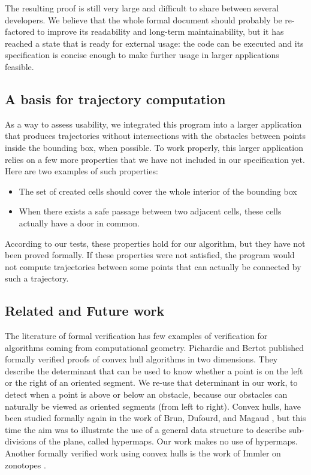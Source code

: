 \documentclass[a4paper, USenglish, cleveref, autoref, thm-restate, final]{lipics-v2021}
\begin{document}
The resulting proof is still very large and difficult to share between several
developers.  We believe that the whole formal document should probably be
re-factored to improve its readability and long-term maintainability, but it
has reached a state that is ready for external usage: the code can be executed
and its specification is concise enough to make further usage in larger
applications feasible.

\subsection{A basis for trajectory computation}
As a way to assess usability, we integrated this program into a larger
application that produces trajectories without intersections with
the obstacles between points inside the bounding
box, when possible.  To work properly, this larger application relies
on a few more properties that we have not included in our specification yet.
Here are two examples of such properties:
\begin{itemize}
\item The set of created cells should cover the whole interior of the
  bounding box
\item When there exists a safe passage between two adjacent cells, these
  cells actually have a door in common.
\end{itemize}
According to our tests, these properties hold for our algorithm, but
they have not been proved formally.  If these properties were not satisfied,
the program would not compute trajectories between some points that can
actually be connected by such a trajectory.

\subsection{Related and Future work}
The literature of formal verification has few examples of verification for
algorithms coming from computational geometry.  Pichardie and Bertot
\cite{pichardie:hal-01702679} published
formally verified proofs of convex hull algorithms in two dimensions.  They
describe the determinant that can be used to know whether a point is on the
left or the right of an oriented segment.  We re-use that determinant in our
work, to detect when a point is above or below an obstacle, because our
obstacles can naturally be viewed as oriented segments (from left to right).
Convex hulls, have been studied formally again in the work of Brun, Dufourd,
and Magaud \cite{brun:hal-00955400}, but this time the aim was to illustrate
the use of a general data structure to describe sub-divisions of the plane,
called hypermaps.  Our work makes no use of hypermaps.  Another formally
verified work using convex hulls is the work of Immler on
zonotopes \cite{ImmlerZonotopes15}.
\end{document}
